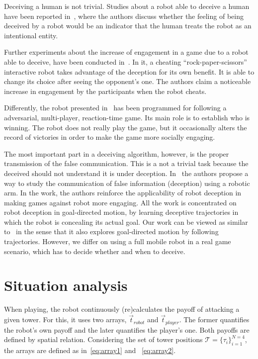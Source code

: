 Deceiving a human is not trivial. Studies about a robot able to deceive a human have been reported in~\cite{terada_can_2010}, where the authors discuss whether the feeling of being deceived by a robot would be an indicator that the human treats the robot as an intentional entity. 

Further experiments about the increase of engagement in a game due to a robot able to deceive, have been conducted in~\cite{short_no_2010}. In it, a cheating ``rock-paper-scissors'' interactive robot takes advantage of the deception for its own benefit. It is able to change its choice after seeing the opponent's one. The authors claim a noticeable increase in engagement by the participants when the robot cheats.

Differently, the robot presented in~\cite{vazquez_deceptive_2011} has been programmed for following a adversarial, multi-player, reaction-time game. Its main role is to establish who is winning. The robot does not really play the game, but it occasionally alters the record of victories in order to make the game more socially engaging.

The most important part in a deceiving algorithm, however, is the proper transmission of the false communication. This is a not a trivial task because the deceived should not understand it is under deception. In~\cite{dragan_analysis_2014} the authors propose a way to study the communication of false information (deception) using a robotic arm. In the work, the authors reinforce the applicability of robot deception in making games against robot more engaging. All the work is concentrated on robot deception in goal-directed motion, by learning deceptive trajectories in which the robot is concealing its actual goal. Our work can be viewed as similar to~\cite{dragan_analysis_2014} in the sense that it also explores goal-directed motion by following trajectories. However, we differ on using a full mobile robot in a real game scenario, which has to decide whether and when to deceive. 

\section{Situation analysis}\label{sec:deception_detecting_it}
When playing, the robot continuously (re)calculates the payoff of attacking a given tower. For this, it uses two arrays, $\overrightarrow{t}_{robot}$ and $\overrightarrow{t}_{player}$. The former quantifies the robot's own payoff and the later quantifies the player's one. Both payoffs are defined by spatial relation. Considering the set of tower positions $\mathcal{T} = \{\tau_{i}\}_{i=1}^{N=4}$, the arrays are defined as in~\ref{eq:array1} and ~\ref{eq:array2}.

